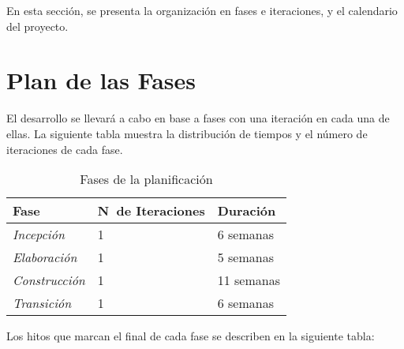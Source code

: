 \normalsize{ \indent
En esta secci\'on, se presenta la organizaci\'on
en fases e iteraciones, y el calendario del
proyecto.
}
\section[Fases]{Plan de las Fases}
\normalsize{ \indent
El desarrollo se llevar\'a a cabo en base a fases
con una iteraci\'on en cada una de ellas. La
siguiente tabla muestra la distribuci\'on de
tiempos y el n\'umero de iteraciones de cada fase.
}
\begin{table}[h!]
	\begin{center}
	\begin{tabular}{ | p{3cm} | p{4cm} | p{3cm} | }
		\hline
		\rowcolor{lightgray}
		\hfil \textbf{Fase} &
		\hfil \textbf{N\textordmasculine \ de Iteraciones} &
		\hfil \textbf{Duraci\'on} \\ 
		\hline
		\textit{Incepci\'on} & 1 & 6 semanas \\
		\hline
		\textit{Elaboraci\'on} & 1 & 5 semanas \\
		\hline
		\textit{Construcci\'on} & 1 & 11 semanas \\
		\hline
		\textit{Transici\'on} & 1 & 6 semanas \\
		\hline
	\end{tabular}
	\end{center}
	\caption{Fases de la planificaci\'on}
\end{table}
\clearpage
\normalsize{ \indent
Los hitos que marcan el final de cada fase se describen
en la siguiente tabla:
}
